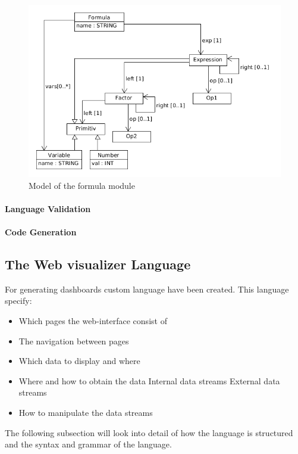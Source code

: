\begin{figure}
  \begin{center}
  \includegraphics[width=\linewidth]{images/MetaFormula}
  \end{center}
  \caption{Model of the formula module}
  \label{fig:formulaModel}
\end{figure}
\paragraph{Language Validation}

\paragraph{Code Generation}


\subsection{The Web visualizer Language}
For generating dashboards custom language have been created.
This language specify:
\begin{itemize}
\item Which pages the web-interface consist of
\item The navigation between pages
\item Which data to display and where
\item Where and how to obtain the data
\subitem Internal data streams
\subitem External data streams
\item How to manipulate the data streams
\end{itemize}
The following subsection will look into detail of how the language is structured and the syntax and grammar of the language.

